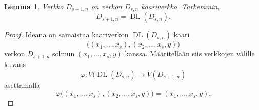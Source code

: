 \documentclass[finnish]{tktltiki2}
\newtheorem{lem}[lau]{Lemma}
\theoremstyle{definition}
\theoremstyle{remark}
\DeclareMathOperator{\DL}{DL}
\newcommand{\Dsn}{D_{s,n}}
\newcommand{\Dssn}{D_{s+1,n}}
\begin{document}
\begin{lem}
    Verkko $\Dssn$ on verkon $\Dsn$ kaariverkko. Tarkemmin,
    \begin{equation*}
        \Dssn = \DL(\Dsn).
    \end{equation*}
\end{lem}

\begin{proof}
    Ideana on samaistaa kaariverkon $\DL(\Dsn)$ kaari
    \begin{equation*}
        \big(
            (x_1, \dots, x_s), (x_2, \dots, x_s, y)
        \big)
    \end{equation*}
    verkon $\Dssn$ solmun $(x_1, \dots, x_s, y)$ kanssa. Määritellään
    siis verkkojen välille kuvaus
    \begin{equation*}
        \varphi \colon V(\DL(\Dsn) \to V(D_{s + 1, n})
    \end{equation*}
    asettamalla
    \begin{equation*}
        \varphi\big(
                   (x_1, \dots, x_s), (x_2, \dots, x_s, y)
               \big) = (x_1, \dots, x_s, y).
    \end{equation*}


\end{proof}
\end{document}
